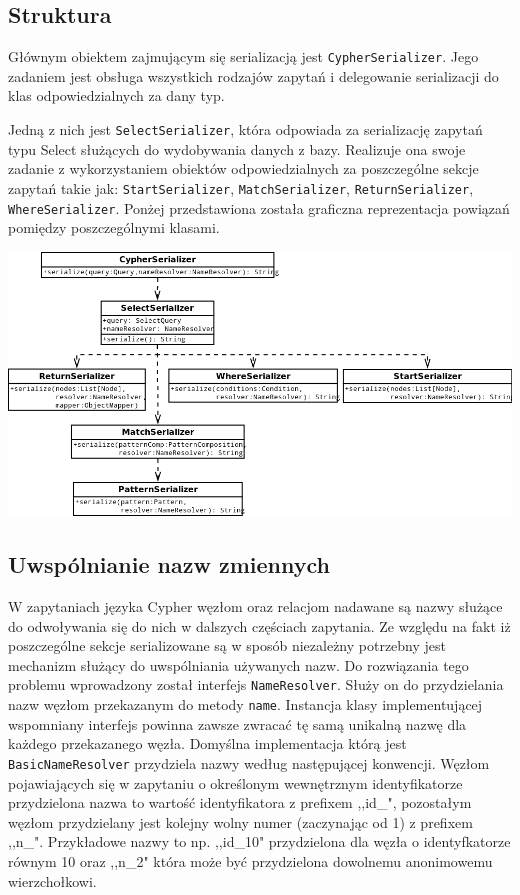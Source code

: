 \documentclass[brudnopis]{xmgr}
\begin{document}
\subsection{Struktura}

Głównym obiektem zajmującym się serializacją jest \texttt{CypherSerializer}. Jego zadaniem jest obsługa wszystkich rodzajów zapytań i delegowanie serializacji do klas odpowiedzialnych za dany typ.

Jedną z nich jest \texttt{SelectSerializer}, która odpowiada za serializację zapytań typu Select służących do wydobywania danych z bazy. Realizuje ona swoje zadanie z wykorzystaniem obiektów odpowiedzialnych za poszczególne sekcje zapytań takie jak: \texttt{StartSerializer}, \texttt{MatchSerializer}, \texttt{ReturnSerializer}, \texttt{WhereSerializer}. Ponżej przedstawiona została graficzna reprezentacja powiązań pomiędzy poszczególnymi klasami.

\includegraphics[scale=0.5]{images/cypher-serialization-uml.png}

\subsection{Uwspólnianie nazw zmiennych}

W zapytaniach języka Cypher węzłom oraz relacjom nadawane są nazwy służące do odwoływania się do nich w dalszych częściach zapytania. Ze względu na fakt iż poszczególne sekcje serializowane są w sposób niezależny potrzebny jest mechanizm służący do uwspólniania używanych nazw. Do rozwiązania tego problemu wprowadzony został interfejs \texttt{NameResolver}. Służy on do przydzielania nazw węzłom przekazanym do metody \texttt{name}. Instancja klasy implementującej wspomniany interfejs powinna zawsze zwracać tę samą unikalną nazwę dla każdego przekazanego węzła. Domyślna implementacja którą jest \texttt{BasicNameResolver} przydziela nazwy według następującej konwencji. Węzłom pojawiających się w zapytaniu o określonym wewnętrznym identyfikatorze przydzielona nazwa to wartość identyfikatora z prefixem ,,id\_", pozostałym węzłom przydzielany jest kolejny wolny numer (zaczynając od 1) z prefixem ,,n\_". Przykładowe nazwy to np. ,,id\_10" przydzielona dla węzła o identyfkatorze równym 10 oraz ,,n\_2" która może być przydzielona dowolnemu anonimowemu wierzchołkowi.
\end{document}
